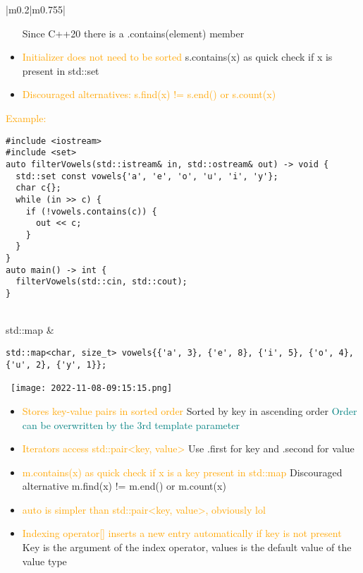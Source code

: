 \documentclass[main.tex,fontsize=8pt,paper=a4,paper=portrait,DIV=calc,]{scrartcl}
\begin{document}
\begin{table}[ht!]
\begin{tabular}{|m{0.2\linewidth}|m{0.755\linewidth}|}
\begin{itemize}
  Since C++20 there is a .contains(element) member
\item \textcolor{orange}{Initializer does not need to be sorted}\newline
  s.contains(x) as quick check if x is present in std::set
\item \textcolor{orange}{Discouraged alternatives: s.find(x) != s.end() or s.count(x)}
\vspace{-2mm}
\end{itemize} 
\textcolor{orange}{Example:}\newline
\begin{lstlisting}
#include <iostream>
#include <set>
auto filterVowels(std::istream& in, std::ostream& out) -> void {
  std::set const vowels{'a', 'e', 'o', 'u', 'i', 'y'};
  char c{};
  while (in >> c) {
    if (!vowels.contains(c)) {
      out << c;
    }
  }
}
auto main() -> int {
  filterVowels(std::cin, std::cout);
}
\end{lstlisting}\\
\hline
std::map  &
\begin{lstlisting}
std::map<char, size_t> vowels{{'a', 3}, {'e', 8}, {'i', 5}, {'o', 4}, {'u', 2}, {'y', 1}};
\end{lstlisting}
\, \newline
\texttt{[image: 2022-11-08-09:15:15.png]}\newline
\begin{itemize}
\item \textcolor{Orange}{Stores key-value pairs in sorted order}\newline
  Sorted by key in ascending order\newline
  \textcolor{teal}{Order can be overwritten by the 3rd template parameter}
\item \textcolor{Orange}{Iterators access std::pair<key, value>}\newline
  Use .first for key and .second for value
\item \textcolor{orange}{m.contains(x) as quick check if x is a key present in std::map}\newline
  Discouraged alternative m.find(x) != m.end() or m.count(x)
\item \textcolor{orange}{auto is simpler than std::pair<key, value>, obviously lol}
\item \textcolor{orange}{Indexing operator[] inserts a new entry automatically if key is not present}\newline
  Key is the argument of the index operator, values is the default value of the value type\newline

\end{itemize}
\end{tabular}
\end{table}
\end{document}

